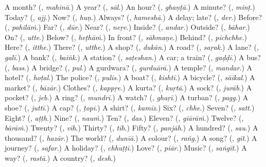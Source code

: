 \begin{tcolorbox}[breakable,colback=teal!4,colframe=teal!35!black,title={Before you move on}]
A month? (\textbf{}, \emph{mahīnā}.) A year? (\textbf{}, \emph{sāl}.) An hour? (\textbf{}, \emph{ghaṇṭā}.) A minute? (\textbf{}, \emph{minṭ}.) Today? (\textbf{}, \emph{ajj}.) Now? (\textbf{}, \emph{huṇ}.) Always? (\textbf{}, \emph{hameshā}.) A delay; late? (\textbf{}, \emph{der}.) Before? (\textbf{}, \emph{pahilāṁ}.) Far? (\textbf{}, \emph{dūr}.) Near? (\textbf{}, \emph{neṛe}.) Inside? (\textbf{}, \emph{andar}.) Outside? (\textbf{}, \emph{bāhar}.) On? (\textbf{}, \emph{utte}.) Below? (\textbf{}, \emph{heṭhāṁ}.) In front? (\textbf{}, \emph{sāhmaṇe}.) Behind? (\textbf{}, \emph{pichchhe}.) Here? (\textbf{}, \emph{itthe}.) There? (\textbf{}, \emph{utthe}.) A shop? (\textbf{}, \emph{dukān}.) A road? (\textbf{}, \emph{saṛak}.) A lane? (\textbf{}, \emph{galī}.) A bank? (\textbf{}, \emph{baiṅk}.) A station? (\textbf{}, \emph{saṭeshan}.) A car; a train? (\textbf{}, \emph{gaḍḍī}.) A bus? (\textbf{}, \emph{bass}.) A bridge? (\textbf{}, \emph{pul}.) A gurdwara? (\textbf{}, \emph{gurduārā}.) A temple? (\textbf{}, \emph{mandar}.) A hotel? (\textbf{}, \emph{hoṭal}.) The police? (\textbf{}, \emph{pulis}.) A boat? (\textbf{}, \emph{kishtī}.) A bicycle? (\textbf{}, \emph{sāīkal}.) A market? (\textbf{}, \emph{bāzār}.) Clothes? (\textbf{}, \emph{kappṛe}.) A kurta? (\textbf{}, \emph{kuṛtā}.) A sock? (\textbf{}, \emph{jurāb}.) A pocket? (\textbf{}, \emph{jeb}.) A ring? (\textbf{}, \emph{mundrī}.) A watch? (\textbf{}, \emph{ghaṛī}.) A turban? (\textbf{}, \emph{pagg}.) A shoe? (\textbf{}, \emph{juttī}.) A cap? (\textbf{}, \emph{ṭopī}.) A shirt? (\textbf{}, \emph{kamīz}.) Six? (\textbf{}, \emph{chhe}.) Seven? (\textbf{}, \emph{satt}.) Eight? (\textbf{}, \emph{aṭṭh}.) Nine? (\textbf{}, \emph{nauṁ}.) Ten? (\textbf{}, \emph{das}.) Eleven? (\textbf{}, \emph{giārāṁ}.) Twelve? (\textbf{}, \emph{bārāṁ}.) Twenty? (\textbf{}, \emph{vīh}.) Thirty? (\textbf{}, \emph{tīh}.) Fifty? (\textbf{}, \emph{panjāh}.) A hundred? (\textbf{}, \emph{sau}.) A thousand? (\textbf{}, \emph{hazār}.) The world? (\textbf{}, \emph{dunīā}.) A colour? (\textbf{}, \emph{raṅg}.) A song? (\textbf{}, \emph{gīt}.) A journey? (\textbf{}, \emph{safar}.) A holiday? (\textbf{}, \emph{chhuṭṭī}.) Love? (\textbf{}, \emph{piār}.) Music? (\textbf{}, \emph{saṅgīt}.) A way? (\textbf{}, \emph{rastā}.) A country? (\textbf{}, \emph{desh}.)
\end{tcolorbox}
